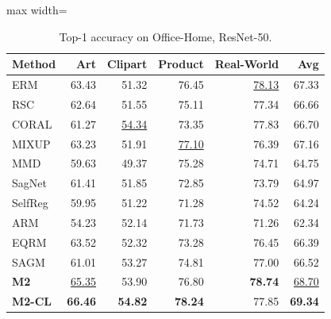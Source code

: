 \documentclass{article}
\begin{document}
\begin{table}[htbp]
\centering
\caption{Top-1 accuracy on Office-Home, ResNet-50.}
\scriptsize
\begin{adjustbox}{max width=\textwidth}
\begin{tabular}{lrrrrr}
\toprule
Method & Art & Clipart & Product & Real-World & Avg \\
\midrule
ERM & 63.43 & 51.32 & 76.45 & \underline{78.13} & 67.33 \\
RSC & 62.64 & 51.55 & 75.11 & 77.34 & 66.66 \\
CORAL & 61.27 & \underline{54.34} & 73.35 & 77.83 & 66.70 \\
MIXUP & 63.23 & 51.91 & \underline{77.10} & 76.39 & 67.16 \\
MMD & 59.63 & 49.37 & 75.28 & 74.71 & 64.75 \\
SagNet & 61.41 & 51.85 & 72.85 & 73.79 & 64.97 \\
SelfReg & 59.95 & 51.22 & 71.28 & 74.52 & 64.24 \\
ARM & 54.23 & 52.14 & 71.73 & 71.26 & 62.34 \\
EQRM & 63.52 & 52.32 & 73.28 & 76.45 & 66.39 \\
SAGM & 61.01 & 53.27 & 74.81 & 77.00 & 66.52 \\
\midrule
\textbf{M2} & \underline{65.35} & 53.90 & 76.80 & \textbf{78.74} & \underline{68.70} \\
\textbf{M2-CL} & \textbf{66.46} & \textbf{54.82} & \textbf{78.24} & 77.85 & \textbf{69.34} \\
\bottomrule
\end{tabular}
\end{adjustbox}
\end{table}
\end{document}
